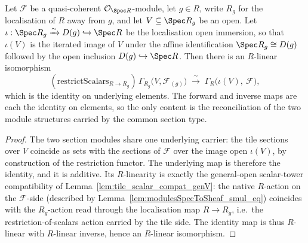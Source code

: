 \begin{lemma}
  \label{lem:tileReconcileEquiv}
  Let \(\mathcal{F}\) be a quasi-coherent \(\mathcal{O}_{\Spec R}\)-module, let \(g \in R\), write \(R_g\)
  for the localisation of \(R\) away from \(g\), and let \(V \subseteq \Spec R_g\) be an open. Let
  \(\iota : \Spec R_g \xrightarrow{\sim} D(g) \hookrightarrow \Spec R\) be the localisation open
  immersion, so that \(\iota(V)\) is the iterated image of \(V\) under the affine identification
  \(\Spec R_g \cong D(g)\) followed by the open inclusion \(D(g) \hookrightarrow \Spec R\). Then there is
  an \(R\)-linear isomorphism
  \[
    (\mathrm{restrictScalars}_{R \to R_g})\, \Gamma_{R_g}\bigl(V, \mathcal{F}_{(g)}\bigr)
      \;\xrightarrow{\ \sim\ }\;
      \Gamma_R\bigl(\iota(V),\ \mathcal{F}\bigr),
  \]
  which is the identity on underlying elements. The forward and inverse maps are each the identity on
  elements, so the only content is the reconciliation of the two module structures carried by the
  common section type.
\end{lemma}
\begin{proof}
  The two section modules share one underlying carrier: the tile sections over \(V\) coincide as
  sets with the sections of \(\mathcal{F}\) over the image open \(\iota(V)\), by construction of the
  restriction functor. The underlying map is therefore the identity, and it is additive. Its \(R\)-linearity is
  exactly the general-open scalar-tower compatibility of Lemma~\ref{lem:tile_scalar_compat_genV}: the
  native \(R\)-action on the \(\mathcal{F}\)-side (described by
  Lemma~\ref{lem:modulesSpecToSheaf_smul_eq}) coincides with the \(R_g\)-action read through the
  localisation map \(R \to R_g\), i.e.\ the restriction-of-scalars action carried by the tile side. The
  identity map is thus \(R\)-linear with \(R\)-linear inverse, hence an \(R\)-linear isomorphism.
\end{proof}

